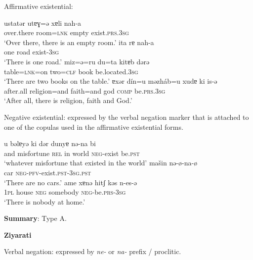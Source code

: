 ﻿\documentclass[output=paper]{langsci/langscibook}
\begin{document}
\begin{unindented}
Affirmative existential:
%
\begin{exe}\ex \gll ustatər utɐɣ=ə xɐli nah-a \\
over.there  room=\textsc{lnk}  empty exist.\textsc{prs.3sg} \\
    \glt `Over there, there is an empty room.' \parencite[310]{RastorguevaKerimova2012}
\ex \gll ita   rɐ    nah-a \\
one road exist-\textsc{3sg} \\
    \glt `There is one road.' \parencite[318]{RastorguevaKerimova2012}
\ex \gll miz=ə=ru du=ta kitɐb dərə \\
table=\textsc{lnk}=on  two=\textsc{clf}   book be.located.\textsc{3sg} \\
    \glt `There are two books on the table.' \parencite[134]{RastorguevaKerimova2012}
\ex \gll ɐxər dín=u məzháb=u xudɐ ki is-ə \\
after.all religion=and faith=and   god   \textsc{comp}    be.\textsc{prs.3sg} \\
    \glt `After all, there is religion, faith and God.' \parencite[275]{RastorguevaKerimova2012} 
    \end{exe}

Negative existential: expressed by the verbal negation marker that is attached to one of the copulas used in the affirmative existential forms.
%
\begin{exe}\ex \gll u bəlɐyə ki dər dunyɐ nə-na bi \\
and misfortune \textsc{rel}  in   world \textsc{neg}-exist   be.\textsc{pst} \\
    \glt `whatever misfortune that existed in the world'\parencite[263]{RastorguevaKerimova2012}
\ex \gll mašin nə-ø-na-ø \\
car \textsc{neg}-\textsc{pfv}-exist.\textsc{pst-3sg.pst} \\
    \glt `There are no cars.' \parencite[326, their glosses and zeroes]{RastorguevaKerimova2012}
\ex \gll ame xɐnə   hitʃ   kəs n-es-ə \\
\textsc{1pl} house \textsc{neg} somebody \textsc{neg}-be.\textsc{prs-3sg}\\
    \glt `There is nobody at home.' \parencite[133]{RastorguevaKerimova2012} 
    \end{exe} 

\textbf{Summary}: Type A.

\textbf{Ziyarati} \citep{ShokriJahani2013} 

Verbal negation: expressed by \textit{ne-} or \textit{na-} prefix / proclitic.


\end{unindented}
\end{document}
